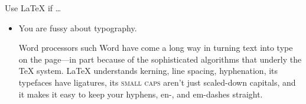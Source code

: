 \begin{frame}[fragile]{Use \LaTeX{} if \dots}
\begin{itemize}
\begin{articleonly}
Because a \LaTeX{} is logically marked up (e.g., using \verb+section+
commands) and not visually formatted directly, it will always be clear
what's a chapter heading and what's a section. Producing a table of
contents is as easy as typing \texttt{\textbackslash tableofcontents}.
\LaTeX{} has sophisticated support for ``floats,'' such as figures and
tables, which it will place automatically in such a way that the rest
of the text appears well-balanced on the page. Of course it will also
automatically generate lists of tables and figures.
\end{articleonly}

\item You are fussy about typography.

\begin{articleonly}
Word processors such Word have come a long way in turning text into
type on the page---in part because of the sophisticated algorithms
that underly the \TeX{} system.  \LaTeX{} understands kerning, line
spacing, hyphenation, its typefaces have ligatures, its \textsc{small
caps} aren't just scaled-down capitals, and it makes it easy to keep
your hyphens, en-, and em-dashes straight.
\end{articleonly}
\end{itemize}

\end{frame}

